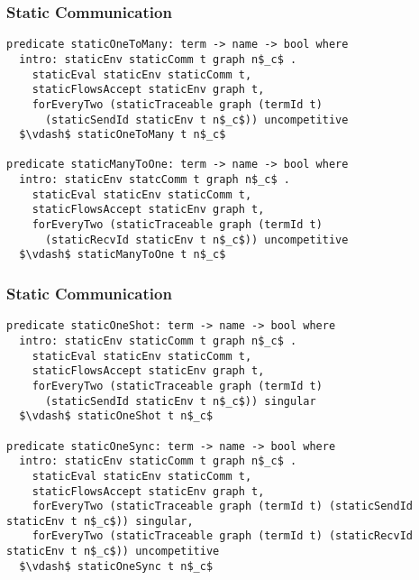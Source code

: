 \documentclass{beamer}
\begin{document}
\begin{frame}[fragile]
	\frametitle{Static Communication}
\begin{lstlisting}[language=logic, mathescape]
predicate staticOneToMany: term -> name -> bool where
  intro: staticEnv staticComm t graph n$_c$ .
    staticEval staticEnv staticComm t,
    staticFlowsAccept staticEnv graph t,
    forEveryTwo (staticTraceable graph (termId t)
      (staticSendId staticEnv t n$_c$)) uncompetitive
  $\vdash$ staticOneToMany t n$_c$

predicate staticManyToOne: term -> name -> bool where
  intro: staticEnv statcComm t graph n$_c$ .
    staticEval staticEnv staticComm t,
    staticFlowsAccept staticEnv graph t,
    forEveryTwo (staticTraceable graph (termId t)
      (staticRecvId staticEnv t n$_c$)) uncompetitive
  $\vdash$ staticManyToOne t n$_c$
\end{lstlisting}
\end{frame}


\begin{frame}[fragile]
	\frametitle{Static Communication}
\begin{lstlisting}[language=logic, mathescape]
predicate staticOneShot: term -> name -> bool where
  intro: staticEnv staticComm t graph n$_c$ .
    staticEval staticEnv staticComm t,
    staticFlowsAccept staticEnv graph t,
    forEveryTwo (staticTraceable graph (termId t)
      (staticSendId staticEnv t n$_c$)) singular
  $\vdash$ staticOneShot t n$_c$

predicate staticOneSync: term -> name -> bool where
  intro: staticEnv staticComm t graph n$_c$ .
    staticEval staticEnv staticComm t,
    staticFlowsAccept staticEnv graph t,
    forEveryTwo (staticTraceable graph (termId t) (staticSendId staticEnv t n$_c$)) singular,
    forEveryTwo (staticTraceable graph (termId t) (staticRecvId staticEnv t n$_c$)) uncompetitive
  $\vdash$ staticOneSync t n$_c$
\end{lstlisting}
\end{frame}
\end{document}
